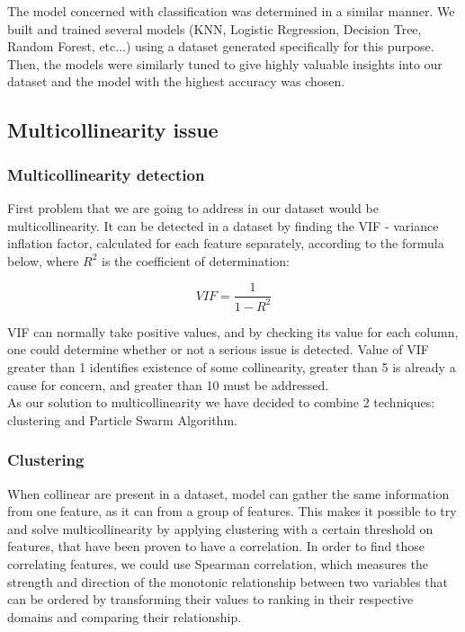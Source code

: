 \documentclass[conference]{IEEEtran}
\begin{document}
The model concerned with classification was determined in a similar manner. We built and trained several models (KNN, Logistic Regression, Decision Tree, Random Forest, etc...) using a dataset generated specifically for this purpose. Then, the models were similarly tuned to give highly valuable insights into our dataset and the model with the highest accuracy was chosen.


\subsection{Multicollinearity issue}

\subsubsection{Multicollinearity detection}

First problem that we are going to address in our dataset would be multicollinearity. It can be detected in a dataset by finding the VIF - variance inflation factor, calculated for each feature separately, according to the formula below, where $R^2$ is the coefficient of determination: 

\begin{equation}
	VIF=\frac{1}{1-R^2}
\end{equation}

VIF can normally take positive values, and by checking its value for each column, one could determine whether or not a serious issue is detected. Value of VIF greater than 1 identifies existence of some collinearity, greater than 5 is already a cause for concern, and greater than 10 must be addressed\cite{menard2002applied}.\\

As our solution to multicollinearity we have decided to combine 2 techniques: clustering and Particle Swarm Algorithm.\\

\subsubsection{Clustering}

When collinear are present in a dataset, model can gather the same information from one feature, as it can from a group of features. This makes it possible to try and solve multicollinearity by applying clustering with a certain threshold on features, that have been proven to have a correlation\cite{sklearnClustering}. In order to find those correlating features, we could use Spearman correlation, which measures the strength and direction of the monotonic relationship between two variables that can be ordered by transforming their values to ranking in their respective domains and comparing their relationship.\\
\end{document}
